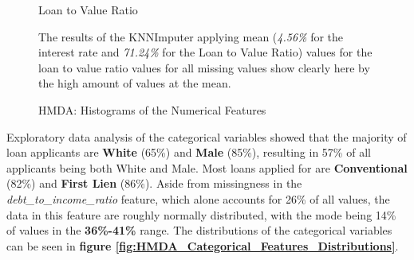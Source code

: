 \begin{figure}[!htbp]
\begin{minipage}{0.5\textwidth}
        \small
        Loan to Value Ratio
    \end{minipage}    
    \caption{HMDA: Histograms of the Numerical Features}
    \medskip
    \small
    The results of the KNNImputer applying mean (\textit{4.56\%} for the interest rate and \textit{71.24\%} for the Loan to Value Ratio) values for the loan to value ratio values for all missing values show clearly here by the high amount of values at the mean.
    \label{fig:CHXX_Numerical_Distributions_2}
\end{figure}

Exploratory data analysis of the categorical variables showed that the majority of loan applicants are \textbf{White} (65\%) and \textbf{Male} (85\%), resulting in 57\% of all applicants being both White and Male.
Most loans applied for are \textbf{Conventional} (82\%) and \textbf{First Lien} (86\%).
Aside from missingness in the \textit{debt\_to\_income\_ratio} feature, which alone accounts for 26\% of all values, the data in this feature are roughly normally distributed, with the mode being 14\% of values in the \textbf{36\%-41\%} range. 
The distributions of the categorical variables can be seen in \textbf{figure \ref{fig:HMDA_Categorical_Features_Distributions}}.

